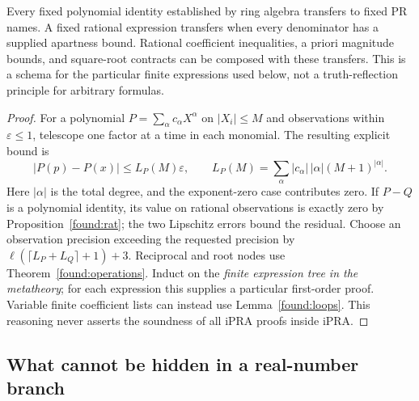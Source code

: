 \begin{proposition}\label{found:transfer}
Every fixed polynomial identity established by ring algebra transfers to fixed PR names. A fixed rational expression transfers when every denominator has a supplied apartness bound. Rational coefficient inequalities, a priori magnitude bounds, and square-root contracts can be composed with these transfers. This is a schema for the particular finite expressions used below, not a truth-reflection principle for arbitrary formulas.
\end{proposition}
\begin{proof}
For a polynomial $P=\sum_\alpha c_\alpha X^\alpha$ on $|X_i|\le M$ and observations within $\varepsilon\le1$, telescope one factor at a time in each monomial. The resulting explicit bound is
\[
 |P(p)-P(x)|\le L_P(M)\varepsilon,\qquad
 L_P(M)=\sum_\alpha |c_\alpha|\,|\alpha|(M+1)^{|\alpha|}.
\]
Here $|\alpha|$ is the total degree, and the exponent-zero case contributes zero. If $P-Q$ is a polynomial identity, its value on rational observations is exactly zero by Proposition~\ref{found:rat}; the two Lipschitz errors bound the residual. Choose an observation precision exceeding the requested precision by
$\ell(\lceil L_P+L_Q\rceil+1)+3$. Reciprocal and root nodes use Theorem~\ref{found:operations}. Induct on the \emph{finite expression tree in the metatheory}; for each expression this supplies a particular first-order proof. Variable finite coefficient lists can instead use Lemma~\ref{found:loops}. This reasoning never asserts the soundness of all iPRA proofs inside iPRA.
\end{proof}

\subsection{What cannot be hidden in a real-number branch}


